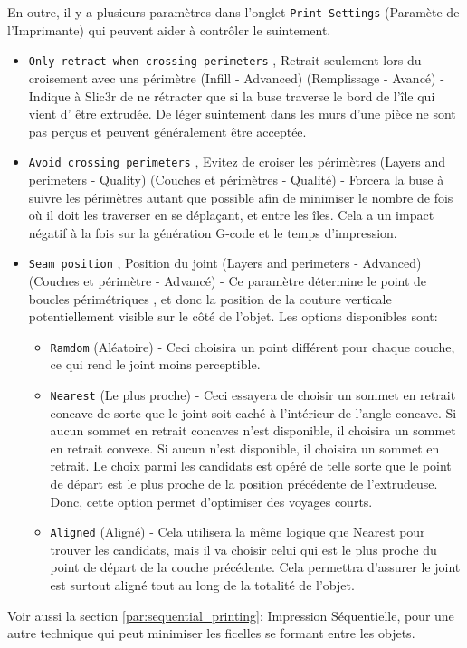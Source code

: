 En outre, il y a plusieurs param\`etres dans l'onglet \texttt{Print Settings} (Param\`ete de l'Imprimante) qui peuvent aider \`a contr\^oler le suintement.

\begin{itemize}
    \item \texttt{Only retract when crossing perimeters} , Retrait seulement lors du croisement avec uns p\'erim\`etre (Infill - Advanced) (Remplissage - Avanc\'e) - Indique \`a Slic3r de ne r\'etracter que si la buse traverse le bord de l'\^ile qui vient d' \^etre extrud\'ee. De l\'eger suintement dans les murs d'une pi\`ece ne sont pas perçus et peuvent g\'en\'eralement \^etre accept\'ee.
	\item \texttt{Avoid crossing perimeters} , Evitez de croiser les p\'erim\`etres (Layers and perimeters - Quality) (Couches et p\'erim\`etres - Qualit\'e) - Forcera la buse \`a suivre les p\'erim\`etres autant que possible afin de minimiser le nombre de fois o\`u il doit les traverser en se d\'eplaçant, et entre les \^iles. Cela a un impact n\'egatif \`a la fois sur la g\'en\'eration G-code et le temps d'impression.
	\item \texttt{Seam position} , Position du joint (Layers and perimeters - Advanced) (Couches et p\'erim\`etre - Advanc\'e) - Ce param\`etre d\'etermine le point de boucles p\'erim\'etriques , et donc la position de la couture verticale potentiellement visible sur le c\^ot\'e de l'objet. Les options disponibles sont:
    \begin{itemize}
        \item \texttt{Ramdom} (Al\'eatoire) - Ceci choisira un point différent pour chaque couche, ce qui rend le joint moins perceptible.
		\item \texttt{Nearest} (Le plus proche) - Ceci essayera de choisir un sommet en retrait concave de sorte que le joint soit caché à l'intérieur de l'angle concave. Si aucun sommet en retrait concaves n'est disponible, il choisira un sommet en retrait convexe. Si aucun n'est disponible, il choisira un sommet en retrait. Le choix parmi les candidats est opéré de telle sorte que le point de départ est le plus proche de la position précédente de l'extrudeuse. Donc, cette option permet d'optimiser des voyages courts.
		\item \texttt{Aligned} (Aligné) - Cela utilisera la même logique que {Nearest} pour trouver les candidats, mais il va choisir celui qui est le plus proche du point de départ de la couche précédente. Cela permettra d'assurer le joint est surtout aligné tout au long de la totalité de l'objet.
	\end{itemize}
\end{itemize}

Voir aussi la section \ref{par:sequential_printing}: Impression S\'equentielle, pour une autre technique qui peut minimiser les ficelles se formant entre les objets.

